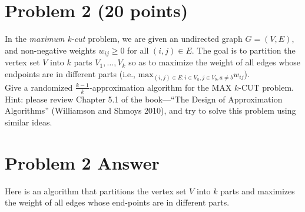 \documentclass[letterpaper, 11pt]{article}
\begin{document}
\newpage
\section{Problem 2 (20 points)}
In the \textit{maximum k-cut} problem, we are given an undirected graph $G=(V,E)$, and non-negative weights $w_{ij} \ge 0$ for all $(i,j) \in E$. The goal is to partition the vertex set $V$ into $k$ parts $V_1, \dots, V_k$ so as to maximize the weight of all edges whose endpoints are in different parts (i.e., $\text{max}_{(i,j)\in E:i \in V_a, j\in V_b, a\ne b}w_{ij}$).\\
Give a randomized $\frac{k-1}{k}$-approximation algorithm for the MAX $k$-CUT problem.\\
Hint: please review Chapter 5.1 of the book---``The Design of Approximation Algorithms'' (Williamson and Shmoys 2010), and try to solve this problem using similar ideas.

\newpage

\section*{Problem 2 Answer}
Here is an algorithm that partitions the vertex set $V$ into $k$ parts and maximizes the weight of all edges whose end-points are in different parts.  

\begin {algorithm}[]
    \begin{algorithmic}[1]
        \State{}set to $null$
        \EndFor
        \State{}uniform selection $x$ from $[0,1]$
        \State{} \textbf{if} x \in $ [j/k, (j + 1)/k]$}
        \newline\indent\State{}{$V_{j+1} \leftarrow V_{j+1} \cup {i}$}
        \EndFor
        \EndFunction{}
    \end{algorithmic}
\end{algorithm}
\end{document}

